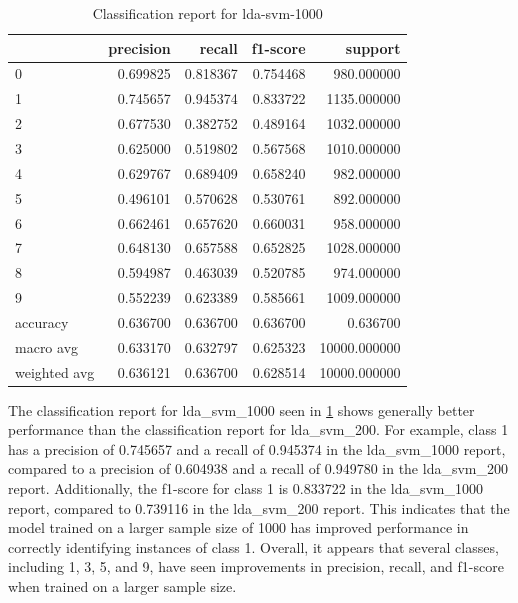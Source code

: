\begin{table}[htb!]
    \centering
    \begin{tabular}{lrrrr}
        \toprule
        & precision & recall & f1-score & support \\
        \midrule
        0 & 0.699825 & 0.818367 & 0.754468 & 980.000000 \\
        1 & 0.745657 & 0.945374 & 0.833722 & 1135.000000 \\
        2 & 0.677530 & 0.382752 & 0.489164 & 1032.000000 \\
        3 & 0.625000 & 0.519802 & 0.567568 & 1010.000000 \\
        4 & 0.629767 & 0.689409 & 0.658240 & 982.000000 \\
        5 & 0.496101 & 0.570628 & 0.530761 & 892.000000 \\
        6 & 0.662461 & 0.657620 & 0.660031 & 958.000000 \\
        7 & 0.648130 & 0.657588 & 0.652825 & 1028.000000 \\
        8 & 0.594987 & 0.463039 & 0.520785 & 974.000000 \\
        9 & 0.552239 & 0.623389 & 0.585661 & 1009.000000 \\
        accuracy & 0.636700 & 0.636700 & 0.636700 & 0.636700 \\
        macro avg & 0.633170 & 0.632797 & 0.625323 & 10000.000000 \\
        weighted avg & 0.636121 & 0.636700 & 0.628514 & 10000.000000 \\
        \bottomrule
    \end{tabular}
    \caption{Classification report for lda-svm-1000}
    \label{tab:classification-report-lda_svm_1000}
\end{table}

The classification report for lda\_svm\_1000 seen in \ref{tab:classification-report-lda_svm_1000} shows generally better performance than the classification report for lda\_svm\_200. For example, class 1 has a precision of 0.745657 and a recall of 0.945374 in the lda\_svm\_1000 report, compared to a precision of 0.604938 and a recall of 0.949780 in the lda\_svm\_200 report. Additionally, the f1-score for class 1 is 0.833722 in the lda\_svm\_1000 report, compared to 0.739116 in the lda\_svm\_200 report. This indicates that the model trained on a larger sample size of 1000 has improved performance in correctly identifying instances of class 1. Overall, it appears that several classes, including 1, 3, 5, and 9, have seen improvements in precision, recall, and f1-score when trained on a larger sample size.


